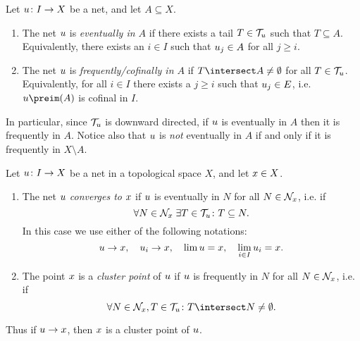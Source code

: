 \documentclass[article, a4paper, 11pt, oneside]{memoir}
\numberwithin{equation}{chapter}
\theoremstyle{nonumberplain}
\begin{document}
\begin{definition}
    Let $u \colon I \to X$ be a net, and let $A \subseteq X$.
    \begin{enumerate}
        \item The net $u$ is \emph{eventually in $A$} if there exists a tail $T \in \mathcal{T}_{u}$ such that $T \subseteq A$. Equivalently, there exists an $i \in I$ such that $u_j \in A$ for all $j \geq i$.

        \item The net $u$ is \emph{frequently/cofinally in $A$} if $T \intersect A \neq \emptyset$ for all $T \in \mathcal{T}_{u}$. Equivalently, for all $i \in I$ there exists a $j \geq i$ such that $u_j \in E$, i.e. $\mynet\preim(A)$ is cofinal in $I$.
    \end{enumerate}
\end{definition}
%
In particular, since $\mathcal{T}_{u}$ is downward directed, if $u$ is eventually in $A$ then it is frequently in $A$. Notice also that $u$ is \emph{not} eventually in $A$ if and only if it is frequently in $X \setminus A$.

\begin{definition}
    Let $u \colon I \to X$ be a net in a topological space $X$, and let $x \in X$.
    \begin{enumerate}
        \item The net $u$ \emph{converges to $x$} if $u$ is eventually in $N$ for all $N \in \mathcal{N}_{x}$, i.e. if
        \begin{equation*}
            \forall N \in \mathcal{N}_{x} \; \exists T \in \mathcal{T}_{u} \colon T \subseteq N.
        \end{equation*}
        In this case we use either of the following notations:
        \begin{equation*}
            u \to x, \quad
            u_i \to x, \quad
            \lim u = x, \quad
            \lim_{i \in I} u_i = x.
        \end{equation*}

        \item The point $x$ is a \emph{cluster point} of $u$ if $u$ is frequently in $N$ for all $N \in \mathcal{N}_{x}$, i.e. if
        \begin{equation*}
            \forall N \in \nhoods{\mylimit}, T \in \tails{\mynet} \colon T \intersect N \neq \emptyset.
        \end{equation*}
    \end{enumerate}
\end{definition}
%
Thus if $u \to x$, then $x$ is a cluster point of $u$.
\end{document}
